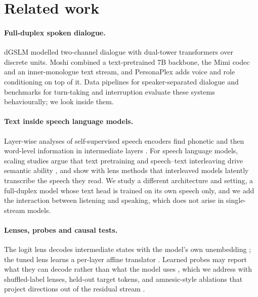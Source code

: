 \documentclass[11pt,a4paper]{article}
\newcommand{\PP}{PersonaPlex}
\begin{document}
\section{Related work}

\paragraph{Full-duplex spoken dialogue.}
dGSLM \citep{nguyen2023dgslm} modelled two-channel dialogue with dual-tower transformers over discrete units.
Moshi \citep{defossez2024moshi} combined a text-pretrained 7B backbone, the Mimi codec and an inner-monologue text stream, and \PP{} \citep{roy2026personaplex} adds voice and role conditioning on top of it.
Data pipelines for speaker-separated dialogue \citep{nakata2026dialoguesidon,nakata2026duplexchat} and benchmarks for turn-taking and interruption \citep{lin2025fdb,lin2025fdb2} evaluate these systems behaviourally; we look inside them.

\paragraph{Text inside speech language models.}
Layer-wise analyses of self-supervised speech encoders find phonetic and then word-level information in intermediate layers \citep{pasad2021layerwise}.
For speech language models, scaling studies argue that text pretraining and speech--text interleaving drive semantic ability \citep{cuervo2024scaling,maimon2025scaling}, and \citet{sternberg2026interleaved} show with lens methods that interleaved models latently transcribe the speech they read.
We study a different architecture and setting, a full-duplex model whose text head is trained on its own speech only, and we add the interaction between listening and speaking, which does not arise in single-stream models.

\paragraph{Lenses, probes and causal tests.}
The logit lens decodes intermediate states with the model's own unembedding \citep{nostalgebraist2020logitlens}; the tuned lens learns a per-layer affine translator \citep{belrose2023tuned}.
Learned probes may report what they can decode rather than what the model uses \citep{hewitt2019control,belinkov2022probing}, which we address with shuffled-label lenses, held-out target tokens, and amnesic-style ablations that project directions out of the residual stream \citep{ravfogel2020null,elazar2021amnesic}.
\end{document}
